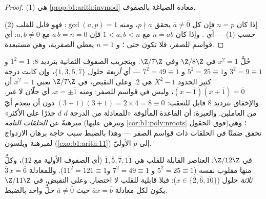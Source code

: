 \begin{proof}
(1) هي \cref{prop:b1:arith:invmod} معادة الصياغة بالصفوف.

(2) إذا كان $n = p$  فإن كل $\overline a \neq \overline 0$ يحقق $p
\nmid a$، ومنه $\gcd(a, p) = 1$: فهو قابل للقلب حسب (1) --- أي . وإذا كان $n =
ab$ مع $1 < a, b < n$ فإن $\overline a\, \overline b = \overline
n = \overline 0$ مع $\overline a, \overline b \neq \overline 0$:
أي قواسم للصفر، فلا تكون حتى ؛ و $n = 1$ يعطي
 الصفرية، وهي مستبعدة.
\end{proof}

\begin{example}\label{ex:b1:structures:sqrtone}
حُلَّ $x^2 = \overline 1$ في $\Z/8\Z$ وفي $\Z/7\Z$. وبتجريب
الصفوف الثمانية بترديد $8$: $1^2 = 1$ و $3^2 = 9 \equiv 1$ و$5^2 = 25
\equiv 1$ و $7^2 = 49 \equiv 1$ --- أي \emph{أربعة} حلول
$\{\overline1, \overline3, \overline5, \overline7\}$، وإن كانت
درجة كثير الحدود $X^2 - 1$ هي $2$. وعلى النقيض، في  $\Z/7\Z$
تعني $x^2 = \overline1$ أن $(x - \overline1)(x +
\overline1) = \overline0$، وليس في  قواسم للصفر: ومنه $x =
\pm\overline1$، أي حلّان لا غير. والإخفاق بترديد $8$ قابل
للتعقب: $(3-1)(3+1) = 2 \times 4 = 8 \equiv 0$ دون أن ينعدم أيّ من
العاملين. والعبرة: أن القاعدة المألوفة «للمعادلة من الدرجة $d$
$d$ جذرًا على الأكثر» مبرهنةٌ عن
\emph{الحلقات التامة} (ويبرهن عليها \cref{cor:b1:poly:nroots} فوق
الحقول)؛ وهي تخفق ضمنًا في الحلقات ذات قواسم الصفر --- وهذا
بالضبط سبب حاجة برهان الازدواج لمبرهنة ويلسون
(\cref{exo:b1:arith:11}) إلى $p$ الأوليّ.
\end{example}

\begin{example}[الحساب في $\Z/n\Z$]\label{ex:b1:structures:zncomputation}
في $\Z/12\Z$: العناصر القابلة للقلب هي $\overline 1, \overline 5, \overline 7,
\overline{11}$ (أي الصفوف الأولية مع $12$)، وكلٌّ منها مقلوب
نفسه ($5^2 = 25 \equiv 1$ و $7^2 = 49 \equiv 1$ و$11^2 = 121 \equiv
1$). وللمعادلة $\overline 3\, x = \overline 6$ \emph{ثلاثة}
حلول ($x \in \{\overline 2, \overline 6, \overline{10}\}$):
فبلا قابلية للقلب لا اختصار. وعلى النقيض، في $\Z/11\Z$
يكون لكل معادلة $\overline a x = \overline b$ حيث $\overline a \neq
\overline 0$ حلٌّ واحد بالضبط.
\end{example}

